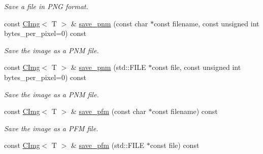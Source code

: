 \begin{DoxyCompactItemize}
\begin{DoxyCompactList}\small\item\em Save a file in PNG format. \item\end{DoxyCompactList}\item 
\hypertarget{structcimg__library_1_1CImg_a5c80359af5af4f25346b3bc789a53d46}{
const \hyperlink{structcimg__library_1_1CImg}{CImg}$<$ T $>$ \& \hyperlink{structcimg__library_1_1CImg_a5c80359af5af4f25346b3bc789a53d46}{save\_\-pnm} (const char $\ast$const filename, const unsigned int bytes\_\-per\_\-pixel=0) const }
\label{structcimg__library_1_1CImg_a5c80359af5af4f25346b3bc789a53d46}

\begin{DoxyCompactList}\small\item\em Save the image as a PNM file. \item\end{DoxyCompactList}\item 
\hypertarget{structcimg__library_1_1CImg_a8a2d40ca5f1810e0f1452a66f56369da}{
const \hyperlink{structcimg__library_1_1CImg}{CImg}$<$ T $>$ \& \hyperlink{structcimg__library_1_1CImg_a8a2d40ca5f1810e0f1452a66f56369da}{save\_\-pnm} (std::FILE $\ast$const file, const unsigned int bytes\_\-per\_\-pixel=0) const }
\label{structcimg__library_1_1CImg_a8a2d40ca5f1810e0f1452a66f56369da}

\begin{DoxyCompactList}\small\item\em Save the image as a PNM file. \item\end{DoxyCompactList}\item 
\hypertarget{structcimg__library_1_1CImg_a896b99bc89430cf4252489230ae2f080}{
const \hyperlink{structcimg__library_1_1CImg}{CImg}$<$ T $>$ \& \hyperlink{structcimg__library_1_1CImg_a896b99bc89430cf4252489230ae2f080}{save\_\-pfm} (const char $\ast$const filename) const }
\label{structcimg__library_1_1CImg_a896b99bc89430cf4252489230ae2f080}

\begin{DoxyCompactList}\small\item\em Save the image as a PFM file. \item\end{DoxyCompactList}\item 
\hypertarget{structcimg__library_1_1CImg_a0d1ae576dedc944acae2a4cc1914bea3}{
const \hyperlink{structcimg__library_1_1CImg}{CImg}$<$ T $>$ \& \hyperlink{structcimg__library_1_1CImg_a0d1ae576dedc944acae2a4cc1914bea3}{save\_\-pfm} (std::FILE $\ast$const file) const }
\label{structcimg__library_1_1CImg_a0d1ae576dedc944acae2a4cc1914bea3}


\end{DoxyCompactItemize}
